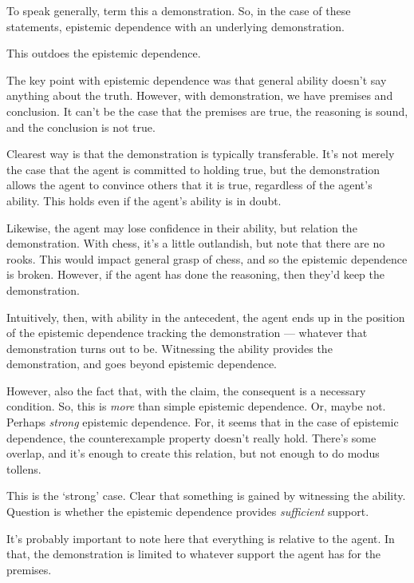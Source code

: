 \documentclass[10pt]{article}
\begin{document}
To speak generally, term this a demonstration.
So, in the case of these statements, epistemic dependence with an underlying demonstration.

This outdoes the epistemic dependence.

The key point with epistemic dependence was that general ability doesn't say anything about the truth.
However, with demonstration, we have premises and conclusion.
It can't be the case that the premises are true, the reasoning is sound, and the conclusion is not true.

Clearest way is that the demonstration is typically transferable.
It's not merely the case that the agent is committed to holding true, but the demonstration allows the agent to convince others that it is true, regardless of the agent's ability.
This holds even if the agent's ability is in doubt.

Likewise, the agent may lose confidence in their ability, but relation the demonstration.
With chess, it's a little outlandish, but note that there are no rooks.
This would impact general grasp of chess, and so the epistemic dependence is broken.
However, if the agent has done the reasoning, then they'd keep the demonstration.

Intuitively, then, with ability in the antecedent, the agent ends up in the position of the epistemic dependence tracking the demonstration --- whatever that demonstration turns out to be.
Witnessing the ability provides the demonstration, and goes beyond epistemic dependence.

However, also the fact that, with the claim, the consequent is a necessary condition.
So, this is \emph{more} than simple epistemic dependence.
Or, maybe not.
Perhaps \emph{strong} epistemic dependence.
For, it seems that in the case of epistemic dependence, the counterexample property doesn't really hold.
There's some overlap, and it's enough to create this relation, but not enough to do modus tollens.

This is the `strong' case.
Clear that something is gained by witnessing the ability.
Question is whether the epistemic dependence provides \emph{sufficient} support.


\begin{note}
  It's probably important to note here that everything is relative to the agent.
  In that, the demonstration is limited to whatever support the agent has for the premises.
\end{note}
\end{document}
